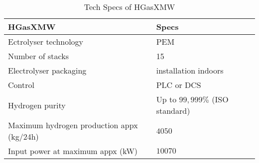 \begin{table}[h]
\centering
\begin{tabular}{|l|l|}
\hline
\rowcolor{bluepoli!40} \textbf{HGasXMW}                          & \textbf{Specs}                  \\ \hline
Ectrolyser technology                     & PEM                             \\ \hline
Number of stacks                          & 15                              \\ \hline
Electrolyser packaging                    & installation indoors            \\ \hline
Control                                   & PLC or DCS                      \\ \hline
Hydrogen purity                           & Up to $99,999\%$ (ISO standard) \\ \hline
Maximum hydrogen production appx (kg/24h) & $4050$                          \\ \hline
Input power at maximum appx (kW)          & $10070$                         \\ \hline
\end{tabular}
\caption{Tech Specs of HGasXMW}
\label{tab:specshydrolyser}
\end{table}